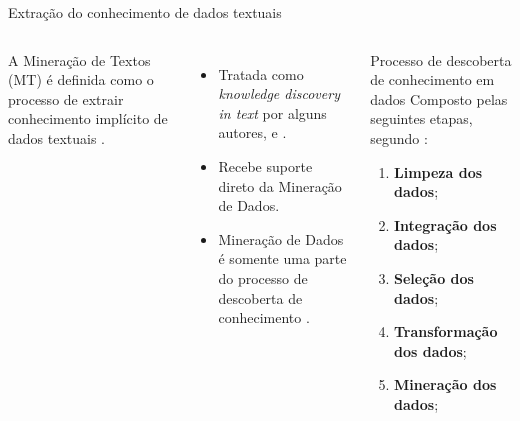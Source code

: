 \documentclass[%
  10pt,%
  aspectratio = 169,%
  compress,%
  t,%
]{beamer}%
\begin{document}
    \begin{frame}[fragile = singleslide]{}{Extração do conhecimento de dados textuais}
        \begin{columns}[t]
        
        A Mineração de Textos (MT) é definida como o processo de extrair conhecimento implícito de dados textuais \cite{Jo2018TMCIBDC,Feldman:2006:TMH:1076381}.
        
        \begin{itemize}
            \item Tratada como \textit{knowledge discovery in text} por alguns autores, \cite{Kodratoff:1999:KDT:646358.689959} e \cite{Feldman:1995:KDT:3001335.3001354}.
            
            \item Recebe suporte direto da Mineração de Dados.
        
            \item Mineração de Dados é somente uma parte do processo de descoberta de conhecimento \cite[p.~6]{Han:2011:DMC:1972541}.
        \end{itemize}
        
        \begin{block}{Processo de descoberta de conhecimento em dados}
            Composto pelas seguintes etapas, segundo \cite[p.~6--7]{Han:2011:DMC:1972541}:
            \begin{enumerate}
                \item \textbf{Limpeza dos dados}; %
                
                \item \textbf{Integração dos dados}; %
                
                \item \textbf{Seleção dos dados}; %
                
                \item \textbf{Transformação dos dados}; %
                
                \item \textbf{Mineração dos dados}; %
                

\end{enumerate}
\end{block}
\end{columns}
\end{frame}
\end{document}
